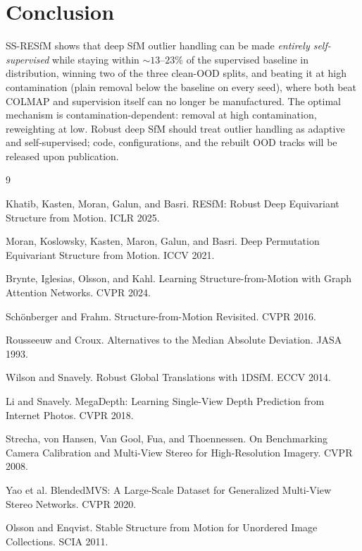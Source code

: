 \documentclass[10pt,twocolumn,letterpaper]{article}
\begin{document}
\section{Conclusion}
SS-RESfM shows that deep SfM outlier handling can be made \emph{entirely
self-supervised} while staying within
$\sim\!13$--$23\%$ of the supervised baseline in distribution, winning two of the three
clean-OOD splits, and beating it at high contamination (plain removal below the baseline on every
seed), where both beat COLMAP and supervision itself can no longer be manufactured. The optimal mechanism is contamination-dependent:
removal at high contamination, reweighting at low. Robust deep SfM should treat outlier
handling as adaptive and self-supervised; code, configurations, and the rebuilt OOD
tracks will be released upon publication.

\label{sec:endcontent}%
\begin{thebibliography}{9}\small

 Khatib, Kasten, Moran, Galun, and Basri. RESfM: Robust Deep Equivariant Structure from Motion. ICLR 2025.

 Moran, Koslowsky, Kasten, Maron, Galun, and Basri. Deep Permutation Equivariant Structure from Motion. ICCV 2021.

 Brynte, Iglesias, Olsson, and Kahl. Learning Structure-from-Motion with Graph Attention Networks. CVPR 2024.

 Sch\"onberger and Frahm. Structure-from-Motion Revisited. CVPR 2016.

 Rousseeuw and Croux. Alternatives to the Median Absolute Deviation. JASA 1993.

 Wilson and Snavely. Robust Global Translations with 1DSfM. ECCV 2014.

 Li and Snavely. MegaDepth: Learning Single-View Depth Prediction from Internet Photos. CVPR 2018.

 Strecha, von Hansen, Van Gool, Fua, and Thoennessen. On Benchmarking Camera Calibration and Multi-View Stereo for High-Resolution Imagery. CVPR 2008.

 Yao et al. BlendedMVS: A Large-Scale Dataset for Generalized Multi-View Stereo Networks. CVPR 2020.

 Olsson and Enqvist. Stable Structure from Motion for Unordered Image Collections. SCIA 2011.

\end{thebibliography}
\end{document}
